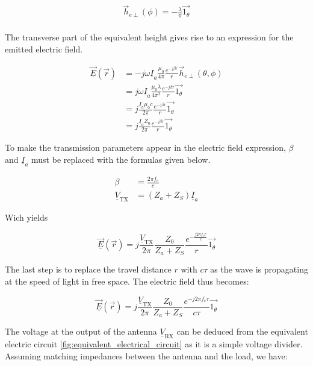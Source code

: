 \documentclass[10pt,a4paper]{ULBreport}
\begin{document}
\begin{align*}
    \vec{h}_{e\perp} (\phi) = -\frac{\lambda}{\pi} \vec{1_{\theta}}\\
\end{align*}

The transverse part of the equivalent height gives rise to an expression for the emitted electric field.
\vspace{-1cm}

\begin{align*}
    \underline{\vec{E}}(\vec{r}) &= -j\omega \underline{I}_a \frac{\mu_0}{4\pi}\frac{e^{-j\beta r}}{r}\vec{h}_{e\perp}(\theta, \phi) \\
    &= j\omega \underline{I}_a \frac{\mu_0\lambda}{4\pi^2}\frac{e^{-j\beta r}}{r} \vec{1_{\theta}} \\
    &= j \frac{\underline{I}_a \mu_0 c}{2\pi} \frac{e^{-j\beta r}}{r} \vec{1_{\theta}}\\
    &= j \frac{\underline{I}_a Z_0}{2\pi} \frac{e^{-j\beta r}}{r} \vec{1_{\theta}}
\end{align*}

To make the transmission parameters appear in the electric field expression, $\beta$ and $\underline{I}_a$ must be replaced with the formulas given below.
\vspace{-1cm}

\begin{align*}
    \beta &= \frac{2\pi f_c}{c}\\
    \underline{V}_{\text{TX}} &= (Z_a + Z_S) \underline{I}_a
\end{align*}

Wich yields

\begin{equation*}
    \underline{\vec{E}}(\vec{r}) = j \frac{\underline{V}_{\text{TX}}}{2\pi}\frac{Z_0}{Z_a + Z_S} \frac{e^{-\frac{j2\pi f_c r}{c}}}{r} \vec{1_{\theta}}
\end{equation*}

The last step is to replace the travel distance $r$ with $c \tau$ as the wave is propagating at the speed of light in free space. The electric field thus becomes:

\begin{equation*}
    \underline{\vec{E}}(\vec{r}) = j \frac{\underline{V}_{\text{TX}}}{2\pi}\frac{Z_0}{Z_a + Z_S} \frac{e^{-j2\pi f_c \tau}}{c\tau} \vec{1_{\theta}}
    \label{eq:emitted_electric_field}
\end{equation*}

The voltage at the output of the antenna $\underline{V}_{\text{RX}}$ can be deduced from the equivalent electric circuit \ref{fig:equivalent_electrical_circuit} as it is a simple voltage divider. Assuming matching impedances between the antenna and the load, we have:
\vspace{-1cm}
\end{document}

